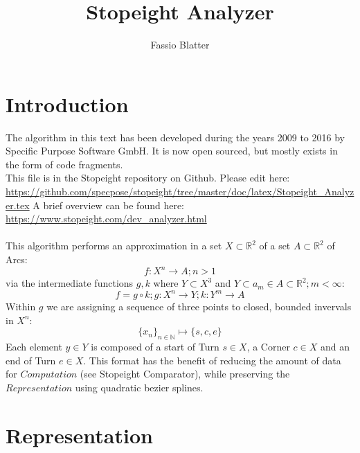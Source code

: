 \documentclass{article}
\begin{document}
\title{Stopeight Analyzer}
\author{Fassio Blatter}
\maketitle

\section{Introduction}

The algorithm in this text has been developed during the years 2009 to 2016 by Specific Purpose Software GmbH. It is now open sourced, but mostly exists in the form of code fragments.\\
This file is in the Stopeight repository on Github. Please edit here:\\
\href{https://github.com/specpose/stopeight/tree/master/doc/latex/Stopeight_Analyzer.tex}{https://github.com/specpose/stopeight/tree/master/doc/latex/Stopeight\_Analyzer.tex}
A brief overview can be found here:\\
\href{https://www.stopeight.com/dev_analyzer.html}{https://www.stopeight.com/dev\_analyzer.html}\\\\
This algorithm performs an approximation in a set $X \subset \mathbb{R}^2$ of a set $A \subset \mathbb{R}^2$ of Arcs:
\begin{equation}
f: X^n \rightarrow A; n>1
\end{equation}
via the intermediate functions $g,k$ where $Y \subset X^3$ and $Y \subset a_{m} \in A \subset \mathbb{R}^2;m<\infty$:
\begin{equation}
f = g \circ k; g: X^n \rightarrow Y; k: Y^m \rightarrow A
\end{equation}
Within $g$ we are assigning a sequence of three points to closed, bounded invervals in $X^n$:
\begin{equation}
\{x_{n}\}_{n \in \mathbb{N}} \mapsto \{s,c,e\}
\end{equation}
Each element $y \in Y$ is composed of a start of Turn $s \in X$, a Corner $c \in X$ and an end of Turn $e \in X$. This format has the benefit of reducing the amount of data for $Computation$ (see Stopeight Comparator), while preserving the $Representation$ using quadratic bezier splines.

\section{Representation}
\end{document}
